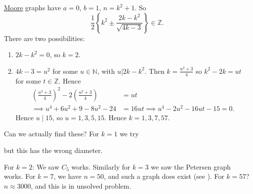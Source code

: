 \documentclass{article}
\begin{document}
\begin{eg}
    \hyperlink{def:moore}{Moore} graphs have $a=0$, $b=1$, $n = k^2+1$.
    So
    \begin{equation*}
        \frac{1}{2} \left\{ k^2 \pm \frac{2k-k^2}{\sqrt{4k-3}}\right\} \in \mathbb{Z}.
    \end{equation*}
    There are two possibilities:
    \begin{enumerate}[label=(\roman*)]
        \item $2k-k^2=0$, so $k=2$.
        \item $4k-3 = u^2$ for some $u \in \mathbb{N}$, with $u | 2k-k^2$.
            Then $k = \frac{u^2+3}{4}$ so $k^2 - 2k = ut$ for some $t \in \mathbb{Z}$.
            Hence
            \begin{align*}
                \left(\frac{u^2+3}{4}\right)^2 - 2 \left(\frac{u^2+3}{4}\right) &= ut \\
                \implies u^4 + 6u^2 + 9 - 8u^2 - 24 &= 16 ut
                \implies u^4 - 2u^2 - 16ut - 15 = 0.
            \end{align*}
            Hence $u \mid 15$, so $u = 1,3,5,15$.
            Hence $k = 1,3,7,57$.
    \end{enumerate}
    Can we actually find these?
    For $k=1$ we try

    \begin{center}
    \end{center}
    but this has the wrong diameter.

    For $k=2$: We saw $C_5$ works.
    Similarly for $k=3$ we saw the Petersen graph works.
    For $k=7$, we have $n=50$, and such a graph does exist (see ).
    For $k=57$? $n \approx 3000$, and this is in unsolved problem.
\end{eg}
\end{document}
